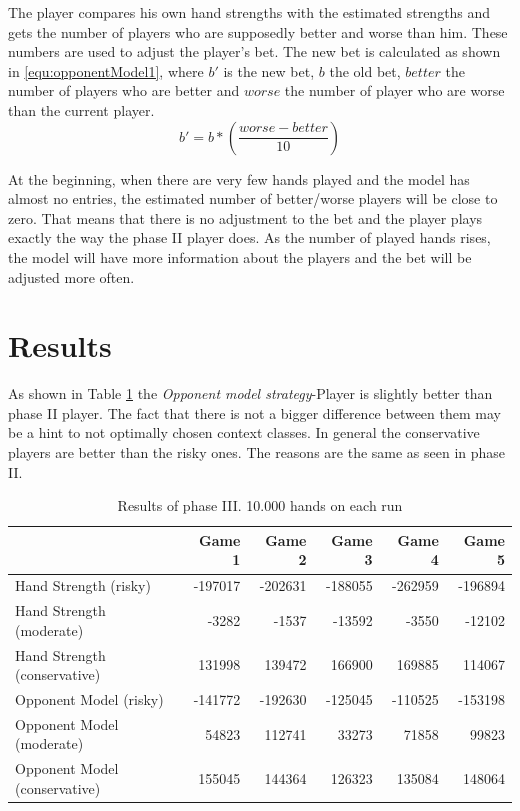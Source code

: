 The player compares his own hand strengths with the estimated strengths and gets the number of players who are supposedly better and worse than him. These numbers are used to adjust the player's bet. The new bet is calculated as shown in \ref{equ:opponentModel1}, where $b'$ is the new bet, $b$ the old bet, $better$ the number of players who are better and $worse$ the number of player who are worse than the current player.
\begin{equation}
	\label{equ:opponentModel1}
	b' = b * (\frac{worse - better}{10})
\end{equation}

At the beginning, when there are very few hands played and the model has almost no entries, the estimated number of better/worse players will be close to zero. That means that there is no adjustment to the bet and the player plays exactly the way the phase II player does. As the number of played hands rises, the model will have more information about the players and the bet will be adjusted more often.

\section{Results}
As shown in Table \ref{tbl:resultsPhase3a} the \emph{Opponent model strategy}-Player is slightly better than phase II player. The fact that there is not a bigger difference between them may be a hint to not optimally chosen context classes. In general the conservative players are better than the risky ones. The reasons are the same as seen in phase II.
\begin{table}[h]
	\centering
	\begin{tabular}[h]{l|r|r|r|r|r}
		& \textbf{Game 1} & \textbf{Game 2} & \textbf{Game 3} & \textbf{Game 4} & \textbf{Game 5}\\
		\hline
		Hand Strength (risky) & -197017 & -202631 & -188055 & -262959 & -196894\\
		Hand Strength (moderate) & -3282 & -1537 & -13592 & -3550 & -12102\\
		Hand Strength (conservative) & 131998 & 139472 & 166900 & 169885 & 114067\\
		Opponent Model (risky) & -141772 & -192630 & -125045 & -110525 & -153198\\
		Opponent Model (moderate) & 54823 & 112741 & 33273 & 71858 & 99823\\
		Opponent Model (conservative) & 155045 & 144364 & 126323 & 135084 & 148064\\
	\end{tabular}
	\caption{Results of phase III. 10.000 hands on each run}
	\label{tbl:resultsPhase3a}
\end{table}


